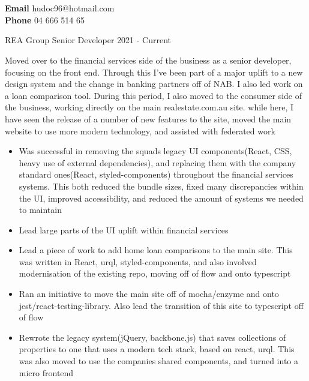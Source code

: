 \documentclass[8pt]{developercv}
\begin{document}
	\begin{minipage}[a]{1.0\textwidth}
		\begin{center}	%
			{ \\}
			\textbf{\\}
			\textbf {Email} hudoc96@hotmail.com \\
			\textbf {Phone} 04 666 514 65 \\
		\end{center}
	\end{minipage}
	\begin{minipage}[t]{1.0\textwidth}
		\begin{entrylist}	%
			\entry
				{REA Group}
				{Senior Developer}
				{2021 - Current}
				{Moved over to the financial services side of the business as a senior developer, focusing on the front end. Through this I've been part of a major uplift to a new design system and the change in banking partners off of NAB. I also led work on a loan comparison tool. 
			During this period, I also moved to the consumer side of the business, working directly on the main realestate.com.au site. while here, I have seen the release of a number of new features to the site, moved the main website to use more modern technology, and assisted with federated work
				\begin{itemize}
					\item Was successful in removing the squads legacy UI components(React, CSS, heavy use of external dependencies), and replacing them with the company standard ones(React, styled-components) throughout the financial services systems. This both reduced the bundle sizes, fixed many discrepancies within the UI, improved accessibility, and reduced the amount of systems we needed to maintain
					\item Lead large parts of the UI uplift within financial services
					\item Lead a piece of work to add home loan comparisons to the main site. This was written in React, urql, styled-components, and also involved modernisation of the existing repo, moving off of flow and onto typescript
					\item Ran an initiative to move the main site off of mocha/enzyme and onto jest/react-testing-library. Also lead the transition of this site to typescript off of flow
					\item Rewrote the legacy system(jQuery, backbone.js) that saves collections of properties to one that uses a modern tech stack, based on react, urql. This was also moved to use the companies shared components, and turned into a micro frontend

\end{itemize}}
\end{entrylist}
\end{minipage}
\end{document}
